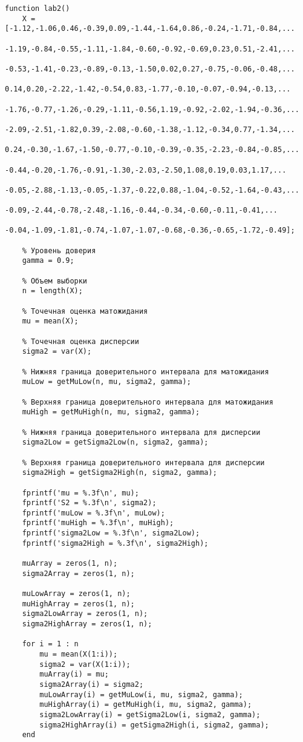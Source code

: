 \documentclass[a4paper, 12pt]{article}
\theoremstyle{definition}
\begin{document}
\begin{lstlisting}
function lab2()
    X = [-1.12,-1.06,0.46,-0.39,0.09,-1.44,-1.64,0.86,-0.24,-1.71,-0.84,...
        -1.19,-0.84,-0.55,-1.11,-1.84,-0.60,-0.92,-0.69,0.23,0.51,-2.41,...
        -0.53,-1.41,-0.23,-0.89,-0.13,-1.50,0.02,0.27,-0.75,-0.06,-0.48,...
        0.14,0.20,-2.22,-1.42,-0.54,0.83,-1.77,-0.10,-0.07,-0.94,-0.13,...
        -1.76,-0.77,-1.26,-0.29,-1.11,-0.56,1.19,-0.92,-2.02,-1.94,-0.36,...
        -2.09,-2.51,-1.82,0.39,-2.08,-0.60,-1.38,-1.12,-0.34,0.77,-1.34,...
        0.24,-0.30,-1.67,-1.50,-0.77,-0.10,-0.39,-0.35,-2.23,-0.84,-0.85,...
        -0.44,-0.20,-1.76,-0.91,-1.30,-2.03,-2.50,1.08,0.19,0.03,1.17,...
        -0.05,-2.88,-1.13,-0.05,-1.37,-0.22,0.88,-1.04,-0.52,-1.64,-0.43,...
        -0.09,-2.44,-0.78,-2.48,-1.16,-0.44,-0.34,-0.60,-0.11,-0.41,...
        -0.04,-1.09,-1.81,-0.74,-1.07,-1.07,-0.68,-0.36,-0.65,-1.72,-0.49];

    % Уровень доверия
    gamma = 0.9;
    
    % Объем выборки 
    n = length(X);
    
    % Точечная оценка матожидания
    mu = mean(X);
    
    % Точечная оценка дисперсии
    sigma2 = var(X);
    
    % Нижняя граница доверительного интервала для матожидания
    muLow = getMuLow(n, mu, sigma2, gamma);
    
    % Верхняя граница доверительного интервала для матожидания
    muHigh = getMuHigh(n, mu, sigma2, gamma);
    
    % Нижняя граница доверительного интервала для дисперсии
    sigma2Low = getSigma2Low(n, sigma2, gamma);
    
    % Верхняя граница доверительного интервала для дисперсии
    sigma2High = getSigma2High(n, sigma2, gamma);
    
    fprintf('mu = %.3f\n', mu);
    fprintf('S2 = %.3f\n', sigma2);
    fprintf('muLow = %.3f\n', muLow);
    fprintf('muHigh = %.3f\n', muHigh);
    fprintf('sigma2Low = %.3f\n', sigma2Low);
    fprintf('sigma2High = %.3f\n', sigma2High);
    
    muArray = zeros(1, n);
    sigma2Array = zeros(1, n);

    muLowArray = zeros(1, n);
    muHighArray = zeros(1, n);
    sigma2LowArray = zeros(1, n);
    sigma2HighArray = zeros(1, n);
    
    for i = 1 : n
        mu = mean(X(1:i));
        sigma2 = var(X(1:i));
        muArray(i) = mu;
        sigma2Array(i) = sigma2;
        muLowArray(i) = getMuLow(i, mu, sigma2, gamma);
        muHighArray(i) = getMuHigh(i, mu, sigma2, gamma);
        sigma2LowArray(i) = getSigma2Low(i, sigma2, gamma);
        sigma2HighArray(i) = getSigma2High(i, sigma2, gamma);
    end
    

\end{lstlisting}
\end{document}

